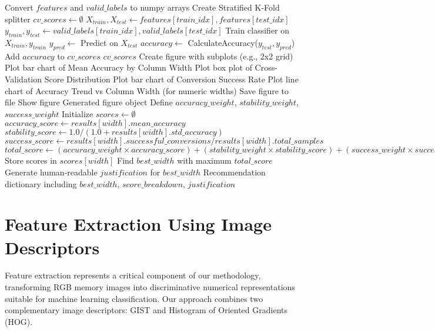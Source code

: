 \begin{algorithm}[!htbp]
\begin{algorithmic}[1]
    \EndFor
    \State Convert $features$ and $valid\_labels$ to numpy arrays
    \State Create Stratified K-Fold splitter
    \State $cv\_scores \leftarrow \emptyset$
        \State $X_{train}, X_{test} \leftarrow features[train\_idx], features[test\_idx]$
        \State $y_{train}, y_{test} \leftarrow valid\_labels[train\_idx], valid\_labels[test\_idx]$
        \State Train classifier on $X_{train}, y_{train}$
        \State $y_{pred} \leftarrow$ Predict on $X_{test}$
        \State $accuracy \leftarrow$ CalculateAccuracy($y_{test}, y_{pred}$)
        \State Add $accuracy$ to $cv\_scores$
    \EndFor
    \Return $cv\_scores$
\EndProcedure
\Statex
{}
    \State Create figure with subplots (e.g., 2x2 grid)
    \State Plot bar chart of Mean Accuracy by Column Width
    \State Plot box plot of Cross-Validation Score Distribution
    \State Plot bar chart of Conversion Success Rate
    \State Plot line chart of Accuracy Trend vs Column Width (for numeric widths)
    \State Save figure to file
    \State Show figure
    \Return Generated figure object
\EndProcedure
\Statex
{}
    \State Define $accuracy\_weight$, $stability\_weight$, $success\_weight$
    \State Initialize $scores \leftarrow \emptyset$
        \State $accuracy\_score \leftarrow results[width].mean\_accuracy$
        \State $stability\_score \leftarrow 1.0 / (1.0 + results[width].std\_accuracy)$
        \State $success\_score \leftarrow results[width].successful\_conversions / results[width].total\_samples$
        \State $total\_score \leftarrow (accuracy\_weight \times accuracy\_score) + (stability\_weight \times stability\_score) + (success\_weight \times success\_score)$
        \State Store scores in $scores[width]$
    \EndFor
    \State Find $best\_width$ with maximum $total\_score$
    \State Generate human-readable $justification$ for $best\_width$
    \Return Recommendation dictionary including $best\_width$, $score\_breakdown$, $justification$
\EndProcedure
\end{algorithmic}
\end{algorithm}

\section{Feature Extraction Using Image Descriptors}
\label{sec:feature-extraction}

Feature extraction represents a critical component of our methodology, transforming RGB memory images into discriminative numerical representations suitable for machine learning classification. Our approach combines two complementary image descriptors: GIST and Histogram of Oriented Gradients (HOG).

